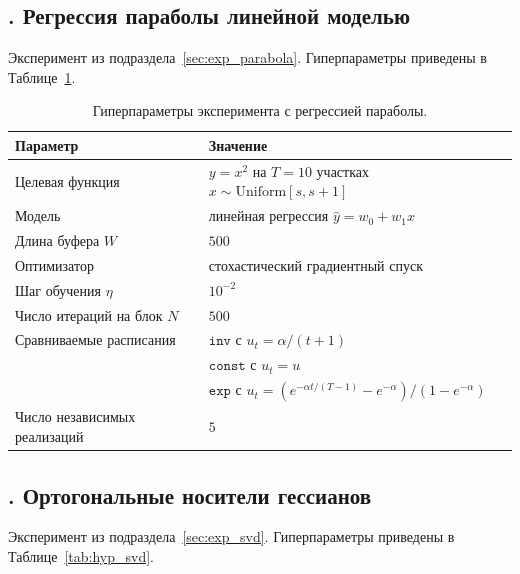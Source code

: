 \documentclass[a4paper,14pt,oneside,openany]{extarticle}
\begin{document}
\subsection*{\theappthm. Регрессия параболы линейной моделью}\label{app:hyp_parabola}

Эксперимент из подраздела~\ref{sec:exp_parabola}. Гиперпараметры приведены в Таблице~\ref{tab:hyp_parabola}.

\begin{table}[h!]
\centering
\small
\caption{Гиперпараметры эксперимента с регрессией параболы.}
\label{tab:hyp_parabola}
\begin{tabularx}{\linewidth}{lX}
\toprule
Параметр & Значение \\
\midrule
Целевая функция & $y = x^2$ на $T = 10$ участках $x \sim \mathrm{Uniform}[s, s+1]$ \\
Модель & линейная регрессия $\hat y = w_0 + w_1 x$ \\
Длина буфера $W$ & $500$ \\
Оптимизатор & стохастический градиентный спуск \\
Шаг обучения $\eta$ & $10^{-2}$ \\
Число итераций на блок $N$ & $500$ \\
Сравниваемые расписания & $\texttt{inv}$ с $u_t = \alpha/(t+1)$ \\
& $\texttt{const}$ с $u_t = u$ \\
& $\texttt{exp}$ с $u_t = (e^{-\alpha t/(T-1)} - e^{-\alpha})/(1 - e^{-\alpha})$ \\
Число независимых реализаций & $5$ \\
\bottomrule
\end{tabularx}
\end{table}

\subsection*{\theappthm. Ортогональные носители гессианов}\label{app:hyp_svd}

Эксперимент из подраздела~\ref{sec:exp_svd}. Гиперпараметры приведены в Таблице~\ref{tab:hyp_svd}.
\end{document}

